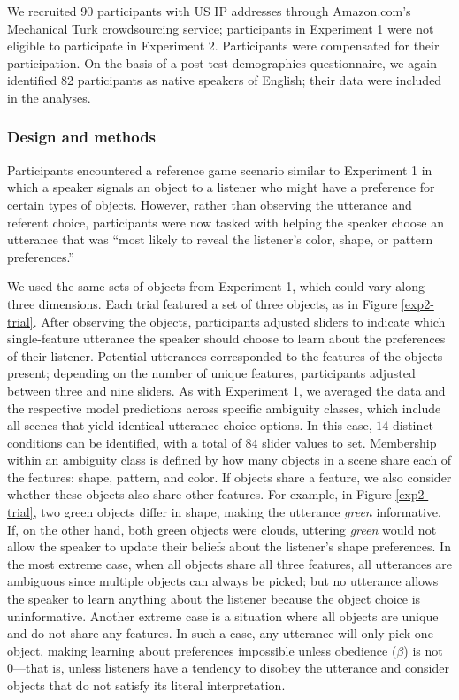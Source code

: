 \documentclass[10pt,a4paper]{article}
\begin{document}
We recruited $90$ participants with US IP addresses through Amazon.com's Mechanical Turk crowdsourcing service; participants in Experiment 1 were not eligible to participate in Experiment 2. Participants were compensated for their participation. On the basis of a post-test demographics questionnaire, we again identified 82 participants as native speakers of English; their data were included in the analyses.

\subsubsection*{Design and methods}

Participants encountered a reference game scenario similar to Experiment 1 in which a speaker signals an object to a listener who might have a preference for certain types of objects. However, rather than observing the utterance and referent choice, participants were now tasked with helping the speaker choose an utterance that was ``most likely to reveal the listener's color, shape, or pattern preferences.''

We used the same sets of objects from Experiment 1, which could vary along three dimensions. Each trial featured a set of three objects, as in Figure \ref{exp2-trial}. After observing the objects, participants adjusted sliders to indicate which single-feature utterance the speaker should choose to learn about the preferences of their listener. Potential utterances corresponded to the features of the objects present; depending on the number of unique features, participants adjusted between three and nine sliders. As with Experiment 1, we averaged the data and the respective model predictions across specific ambiguity classes, which include all scenes that yield identical utterance choice options. 
In this case, $14$ distinct conditions can be identified, with a total of $84$ slider values to set. 
Membership within an ambiguity class is defined by how many objects in a scene share each of the features: shape, pattern, and color. If objects share a feature, we also consider whether these objects also share other features. For example, in Figure \ref{exp2-trial}, two green objects differ in shape, making the utterance \textit{green} informative. If, on the other hand, both green objects were clouds, uttering \textit{green} would not allow the speaker to update their beliefs about the listener's shape preferences.
In the most extreme case, when all objects share all three features, all utterances are ambiguous since multiple objects can always be picked; but no utterance allows the speaker to learn anything about the listener because the object choice is uninformative. Another extreme case is a situation where all objects are unique and do not share any features. In such a case, any utterance will only pick one object, making learning about preferences impossible unless obedience ($\beta$) is not 0---that is, unless listeners have a tendency to disobey the utterance and consider objects that do not satisfy its literal interpretation.
\end{document}
